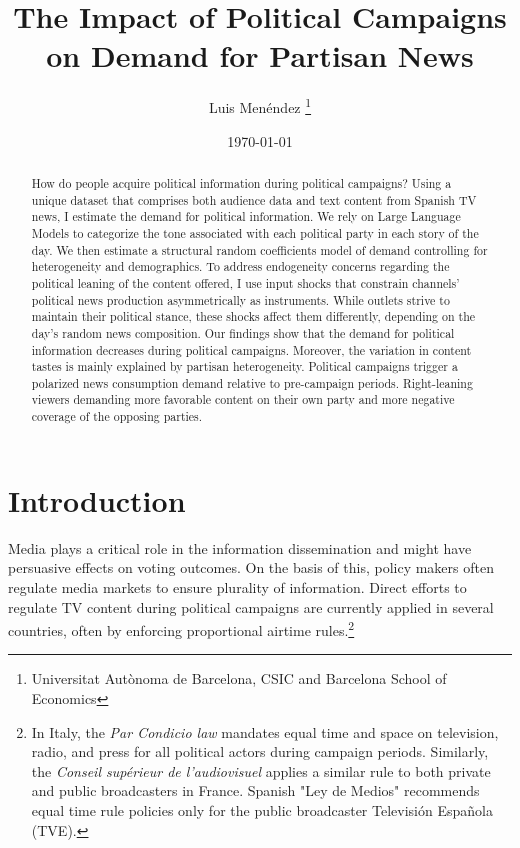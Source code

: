 \documentclass[12pt]{article}
\title{The Impact of Political Campaigns on Demand for Partisan News}
\author{Luis  Menéndez \thanks{Universitat Autònoma de Barcelona, CSIC and Barcelona School of Economics}} %
\date{\today}
\begin{document}
	\maketitle
	
	\begin{abstract}
		
		How do people acquire political information during political campaigns? Using a unique dataset that comprises both audience data and text content from Spanish TV news, I estimate the demand for political information. We rely on Large Language Models to categorize the tone associated with each political party in each story of the day. We then estimate a structural random coefficients model of demand controlling for heterogeneity and demographics. 
		To address endogeneity concerns regarding the political leaning of the content offered, I use input shocks that constrain channels' political news production asymmetrically as instruments. While outlets strive to maintain their political stance, these shocks affect them differently, depending on the day's random news composition. Our findings show that the demand for political information decreases during political campaigns. Moreover, the variation in content tastes is mainly explained by partisan heterogeneity. Political campaigns trigger a polarized news consumption demand relative to pre-campaign periods. Right-leaning viewers demanding more favorable content on their own party and more negative coverage of the opposing parties.
		
	\end{abstract}
	
	
	
	\section{Introduction }
	
	
	Media plays a critical role in the information dissemination and might have persuasive effects on voting outcomes. On the basis of this, policy makers often regulate media markets  to ensure plurality of information.  Direct efforts to regulate TV content during political campaigns are currently applied in several countries, often by enforcing proportional airtime rules.\footnote{In Italy, the \textit{Par Condicio law} mandates equal time and space on television, radio, and press for all political actors during campaign periods. Similarly, the \textit{Conseil supérieur de l'audiovisuel} applies a similar rule to both private and public broadcasters in France. Spanish "Ley de Medios" recommends equal time rule policies only for the public broadcaster Televisión Española (TVE).}
	
\end{document}

